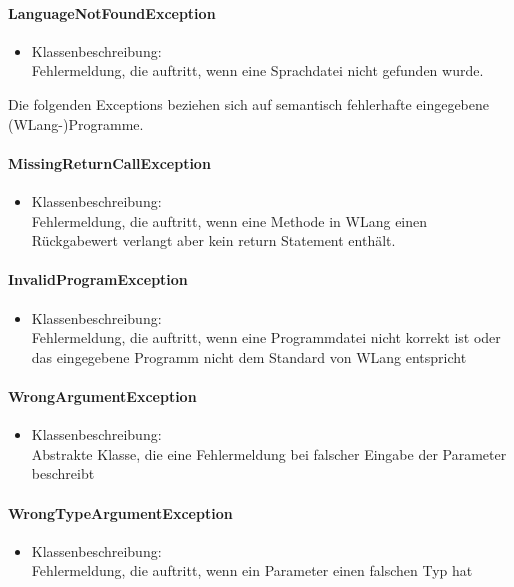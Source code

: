 \documentclass[parskip=full]{scrartcl}
\begin{document}
\paragraph{LanguageNotFoundException}
\begin{itemize}
\item Klassenbeschreibung: \\
Fehlermeldung, die auftritt, wenn eine Sprachdatei nicht gefunden wurde.
\end{itemize}


Die folgenden Exceptions beziehen sich auf semantisch fehlerhafte eingegebene (WLang-)Programme.
\paragraph{MissingReturnCallException}
\begin{itemize}
\item Klassenbeschreibung: \\
Fehlermeldung, die auftritt, wenn eine Methode in WLang einen Rückgabewert verlangt aber kein return Statement enthält.
\end{itemize}

\paragraph{InvalidProgramException}
\begin{itemize}
\item Klassenbeschreibung: \\
Fehlermeldung, die auftritt, wenn eine Programmdatei nicht korrekt ist oder das eingegebene Programm nicht dem Standard von WLang entspricht
\end{itemize}

\paragraph{WrongArgumentException}
\begin{itemize}
\item Klassenbeschreibung: \\
Abstrakte Klasse, die eine Fehlermeldung bei falscher Eingabe der Parameter beschreibt
\end{itemize}

\paragraph{WrongTypeArgumentException}
\begin{itemize}
\item Klassenbeschreibung: \\
Fehlermeldung, die auftritt, wenn ein Parameter einen falschen Typ hat
\end{itemize}
\end{document}
